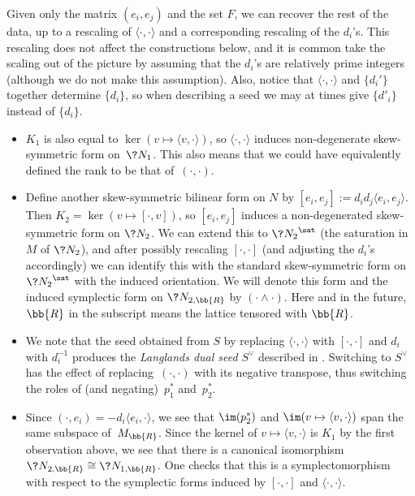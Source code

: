\begin{rmk}\label{determined}Given only the matrix $(e_i,e_j)$ and the set $F$, we can recover the rest of the data, up to a rescaling of $\langle \cdot,\cdot\rangle$ and a corresponding rescaling of the $d_i$'s. This rescaling does not affect the constructions below, and it is common take the scaling out of the picture by assuming that the $d_i$'s are relatively prime integers (although we do not make this assumption). Also, notice that $\langle\cdot,\cdot\rangle$ and $\{d_i'\}$ together determine $\{d_i\}$, so when describing a seed we may at times give $\{d'_i\}$ instead of $\{d_i\}$.
\end{rmk}

\begin{obss}\label{Cluster Obs}\quad
\begin{itemize}\itemsep=0pt
\item $K_1$ is also equal to $\ker (v\mapsto \langle v,\cdot\rangle )$, so $\langle \cdot,\cdot\rangle$ induces non-degenerate skew-symmetric form on~$\?{N_1}$. This also means that we could have equivalently defined the rank to be that of~$(\cdot,\cdot)$.
\item Define another skew-symmetric bilinear form on $N$ by $[e_i,e_j]:=d_id_j\langle e_i,e_j \rangle$. Then $K_2=\ker\left(v\mapsto [ \cdot,v ] \right)$, so $[e_i,e_j]$ induces a non-degenerated skew-symmetric form on $\?{N_2}$. We can extend this to $\?{N_2}^{\sat}$ (the saturation in $M$ of $\?{N_2}$), and after possibly rescaling $[\cdot,\cdot]$ (and adjusting the $d_i$'s accordingly) we can identify this with the standard skew-symmetric form on $\?{N_2}^{\sat}$ with the induced orientation. We will denote this form and the induced symplectic form on $\?{N_{2,\bb{R}}}$ by $(\cdot\wedge \cdot)$. Here and in the future, $\bb{R}$ in the subscript means the lattice tensored with $\bb{R}$.
\item We note that the seed obtained from $S$ by replacing $\langle \cdot,\cdot\rangle$ with $[\cdot,\cdot]$ and $d_i$ with $d_i^{-1}$ produces the {\it Langlands dual seed} $S^{\vee}$ described in \cite{FG1}.
 Switching to $S^{\vee}$ has the effect of replacing~$(\cdot,\cdot)$ with its negative transpose, thus switching the roles of (and negating)~$p_1^*$ and~$p_2^*$.
\item Since $(\cdot, e_i) = -d_i\langle e_i,\cdot\rangle$, we see that $\im(p^*_2)$ and $\im(v\mapsto \langle v,\cdot\rangle)$ span the same subspace of~$M_{\bb{R}}$. Since the kernel of $v\mapsto \langle v,\cdot\rangle$ is $K_1$ by the first observation above, we see that there is a canonical isomorphism $\?{N_{2,\bb{R}}}\cong \?{N_{1,\bb{R}}}$. One checks that this is a symplectomorphism with respect to the symplectic forms induced by $[\cdot,\cdot]$ and $\langle \cdot,\cdot\rangle$.
\end{itemize}
\end{obss}

